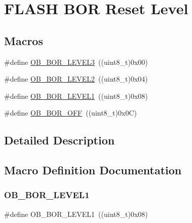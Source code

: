 \hypertarget{group___f_l_a_s_h_ex___b_o_r___reset___level}{}\section{F\+L\+A\+SH B\+OR Reset Level}
\label{group___f_l_a_s_h_ex___b_o_r___reset___level}
\subsection*{Macros}
\begin{DoxyCompactItemize}
\item 
\#define \hyperlink{group___f_l_a_s_h_ex___b_o_r___reset___level_ga3132b8202c0a345e9dd33d136714b046}{O\+B\+\_\+\+B\+O\+R\+\_\+\+L\+E\+V\+E\+L3}~((uint8\+\_\+t)0x00)
\item 
\#define \hyperlink{group___f_l_a_s_h_ex___b_o_r___reset___level_gad678e849fcf817f6ed2d837538e8ebc2}{O\+B\+\_\+\+B\+O\+R\+\_\+\+L\+E\+V\+E\+L2}~((uint8\+\_\+t)0x04)
\item 
\#define \hyperlink{group___f_l_a_s_h_ex___b_o_r___reset___level_ga3a888b788e75f0bc1f9add85c9ccd9d6}{O\+B\+\_\+\+B\+O\+R\+\_\+\+L\+E\+V\+E\+L1}~((uint8\+\_\+t)0x08)
\item 
\#define \hyperlink{group___f_l_a_s_h_ex___b_o_r___reset___level_gaabc231cb1d05a94fe860f67bb5a37b12}{O\+B\+\_\+\+B\+O\+R\+\_\+\+O\+FF}~((uint8\+\_\+t)0x0\+C)
\end{DoxyCompactItemize}


\subsection{Detailed Description}


\subsection{Macro Definition Documentation}
\mbox{\label{group___f_l_a_s_h_ex___b_o_r___reset___level_ga3a888b788e75f0bc1f9add85c9ccd9d6}} 
\subsubsection{\texorpdfstring{O\+B\+\_\+\+B\+O\+R\+\_\+\+L\+E\+V\+E\+L1}{OB\_BOR\_LEVEL1}}
{\footnotesize\ttfamily \#define O\+B\+\_\+\+B\+O\+R\+\_\+\+L\+E\+V\+E\+L1~((uint8\+\_\+t)0x08)}

